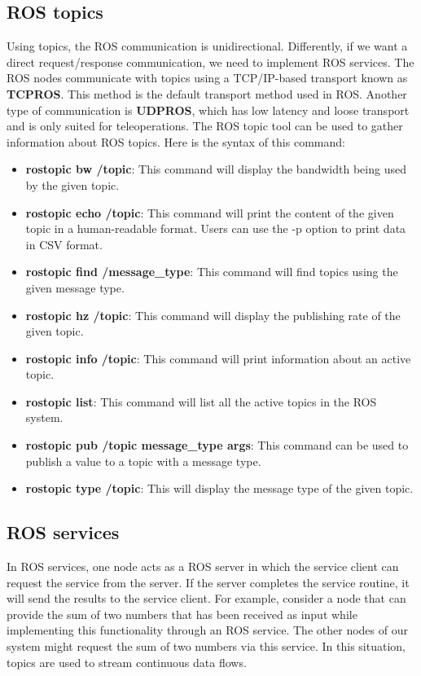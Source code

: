 \documentclass[../../main]{subfiles}
\begin{document}
\subsection{ROS topics}
Using topics, the ROS communication is unidirectional. Differently, if we want a direct
request/response communication, we need to implement ROS services.
The ROS nodes communicate with topics using a TCP/IP-based transport known as \textbf{TCPROS}. This method is the default transport method used in ROS. Another type of communication is \textbf{UDPROS}, which has low latency and loose transport and is only suited for teleoperations.
The ROS topic tool can be used to gather information about ROS topics. Here is the syntax of this command:
\begin{itemize}
    \item \textbf{rostopic bw /topic}: This command will display the bandwidth being used by the given topic.
    \item \textbf{rostopic echo /topic}: This command will print the content of the given topic in a human-readable format. Users can use the -p option to print data in CSV format.
    \item \textbf{rostopic find /message\_type}: This command will find topics using the given message type.
    \item \textbf{rostopic hz /topic}: This command will display the publishing rate of the given topic.
    \item \textbf{rostopic info /topic}: This command will print information about an active topic.
    \item \textbf{rostopic list}: This command will list all the active topics in the ROS system.
    \item \textbf{rostopic pub /topic message\_type args}: This command can be used to publish a value to a topic with a message type.
    \item \textbf{rostopic type /topic}: This will display the message type of the given topic.
\end{itemize}

\subsection{ROS services}
In ROS services, one node acts as a ROS server in which the service client can request the service from the server. If the server completes the service routine, it will send the results to the service client. For example, consider a node that can provide the sum of two numbers that has been received as input while implementing this functionality through an ROS service. The other nodes of our system might request the sum of two numbers via this service. In this situation, topics are used to stream continuous data flows.
\end{document}
